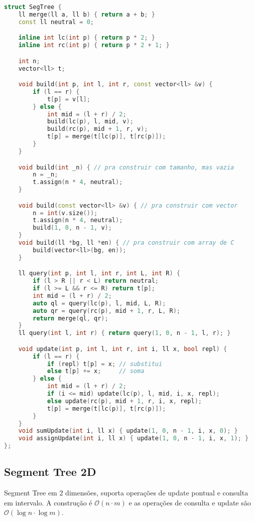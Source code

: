 \documentclass[10pt, a4paper, oneside]{book}
\begin{document}
\begin{lstlisting}[language=C++]
struct SegTree {
    ll merge(ll a, ll b) { return a + b; }
    const ll neutral = 0;

    inline int lc(int p) { return p * 2; }
    inline int rc(int p) { return p * 2 + 1; }

    int n;
    vector<ll> t;

    void build(int p, int l, int r, const vector<ll> &v) {
        if (l == r) {
            t[p] = v[l];
        } else {
            int mid = (l + r) / 2;
            build(lc(p), l, mid, v);
            build(rc(p), mid + 1, r, v);
            t[p] = merge(t[lc(p)], t[rc(p)]);
        }
    }

    void build(int _n) { // pra construir com tamanho, mas vazia
        n = _n;
        t.assign(n * 4, neutral);
    }

    void build(const vector<ll> &v) { // pra construir com vector
        n = int(v.size());
        t.assign(n * 4, neutral);
        build(1, 0, n - 1, v);
    }
    void build(ll *bg, ll *en) { // pra construir com array de C
        build(vector<ll>(bg, en));
    }

    ll query(int p, int l, int r, int L, int R) {
        if (l > R || r < L) return neutral;
        if (l >= L && r <= R) return t[p];
        int mid = (l + r) / 2;
        auto ql = query(lc(p), l, mid, L, R);
        auto qr = query(rc(p), mid + 1, r, L, R);
        return merge(ql, qr);
    }
    ll query(int l, int r) { return query(1, 0, n - 1, l, r); }

    void update(int p, int l, int r, int i, ll x, bool repl) {
        if (l == r) {
            if (repl) t[p] = x; // substitui
            else t[p] += x;     // soma
        } else {
            int mid = (l + r) / 2;
            if (i <= mid) update(lc(p), l, mid, i, x, repl);
            else update(rc(p), mid + 1, r, i, x, repl);
            t[p] = merge(t[lc(p)], t[rc(p)]);
        }
    }
    void sumUpdate(int i, ll x) { update(1, 0, n - 1, i, x, 0); }
    void assignUpdate(int i, ll x) { update(1, 0, n - 1, i, x, 1); }
};
\end{lstlisting}
\hfill

\subsection{Segment Tree 2D}


Segment Tree em 2 dimensões, suporta operações de update pontual e consulta em intervalo. A construção é $\mathcal{O}(n \cdot m)$ e as operações de consulta e update são $\mathcal{O}(\log n \cdot \log m)$.
\hfill
\end{document}

